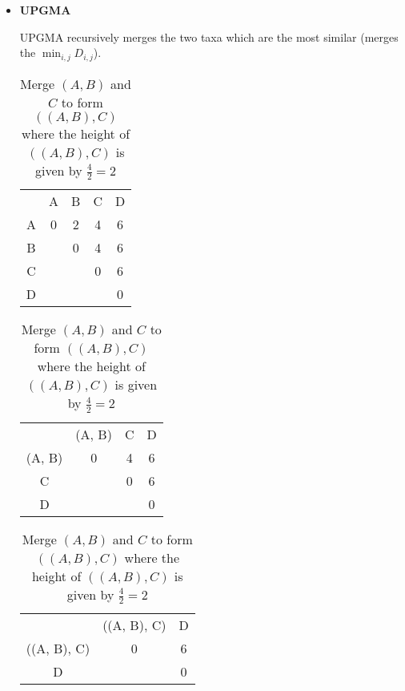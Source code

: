 \documentclass[10pt,\jkfside,a4paper]{article}
\begin{document}
\begin{enumerate}
\begin{table}[H]
\begin{tabular}{ccccc}
        \end{tabular}

    \end{table}

    \begin{itemize}

        \item \textbf{UPGMA}

        UPGMA recursively merges the two taxa which are the most similar (\ie merges the $\min_{i, j}D_{i, j}$).

        \begin{table}[H]

            \centering

            \begin{tabular}{ccccc}

                & A & B & C & D \\
                A & 0 & 2 & 4 & 6 \\
                B & & 0 & 4 & 6 \\
                C & & & 0 & 6 \\
                D & & & & 0 \\

            \end{tabular}

            \caption{Merge $A$ and $B$ to form $(A, B)$ where the height of $(A, B)$ is given by $\frac{2}{2} = 1$}

            \centering

            \begin{tabular}{cccc}

                & (A, B) & C & D \\
                (A, B) & 0 & 4 & 6 \\
                C        & & 0 & 6 \\
                D        & & & 0 \\

            \end{tabular}

            \caption{Merge $(A, B)$ and $C$ to form $((A, B), C)$ where the height of $((A, B), C)$ is given by $\frac{4}{2} = 2$}

            \centering

            \begin{tabular}{ccc}

                & ((A, B), C) & D \\
                ((A, B), C) & 0 & 6 \\
                D        & & 0 \\


\end{tabular}
\end{table}
\end{itemize}
\end{enumerate}
\end{document}
